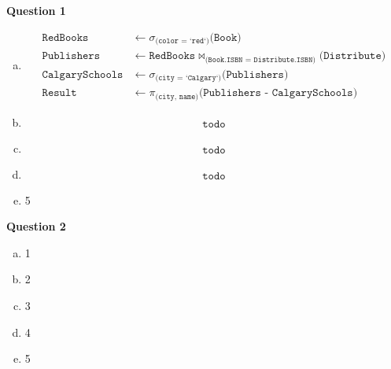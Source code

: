 \documentclass[11pt]{article}
\def\code#1{\texttt{#1}}
\def\select#1{\sigma_{\code{#1}}}
\def\join#1{\bowtie_{\code{#1}}}
\def\proj#1{\pi_{\code{#1}}}
\begin{document}
\item[] \textbf{Question 1}

  \begin{enumerate}[a.]
    \item
      \begin{equation*}
      \begin{aligned}
        \code{RedBooks} &\leftarrow \select{(color = `red`)} \code{(Book)} \\
        \code{Publishers} &\leftarrow \code{RedBooks} \join{(Book.ISBN = Distribute.ISBN)} \code{(Distribute)} \\
        \code{CalgarySchools} &\leftarrow \select{(city = `Calgary`)} \code{(Publishers)} \\
        \code{Result} &\leftarrow \proj{(city, name)} \code{(Publishers - CalgarySchools)}
      \end{aligned}
      \end{equation*}

    \item
      \begin{equation*}
      \begin{aligned}
				\code{todo}
      \end{aligned}
      \end{equation*}

    \item 
      \begin{equation*}
      \begin{aligned}
				\code{todo}
      \end{aligned}
      \end{equation*}

    \item
      \begin{equation*}
      \begin{aligned}
				\code{todo}
      \end{aligned}
      \end{equation*}

    \item 5
  \end{enumerate}


\item[] \textbf{Question 2}

  \begin{enumerate}[a.]

    \item 1
    \item 2
    \item 3
    \item 4
    \item 5

  \end{enumerate}
\end{document}
